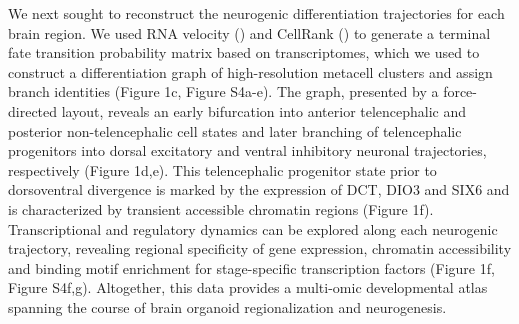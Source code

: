 We next sought to reconstruct the neurogenic differentiation trajectories for each brain region. We used RNA velocity (\cite{manno_rna_2018,bergen_generalizing_2020}) and CellRank (\cite{lange_cellrank_2022}) to generate a terminal fate transition probability matrix based on transcriptomes, which we used to construct a differentiation graph of high-resolution metacell clusters and assign branch identities (Figure 1c, Figure S4a-e). The graph, presented by a force-directed layout, reveals an early bifurcation into anterior telencephalic and posterior non-telencephalic cell states and later branching of telencephalic progenitors into dorsal excitatory and ventral inhibitory neuronal trajectories, respectively (Figure 1d,e). This telencephalic progenitor state prior to dorsoventral divergence is marked by the expression of DCT, DIO3 and SIX6 and is characterized by transient accessible chromatin regions (Figure 1f). Transcriptional and regulatory dynamics can be explored along each neurogenic trajectory, revealing regional specificity of gene expression, chromatin accessibility and binding motif enrichment for stage-specific transcription factors (Figure 1f, Figure S4f,g). Altogether, this data provides a multi-omic developmental atlas spanning the course of brain organoid regionalization and neurogenesis.
 

